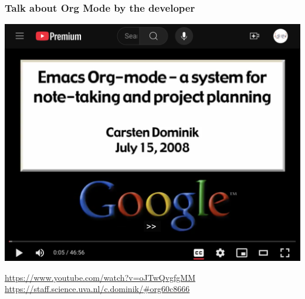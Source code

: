 \documentclass[aspectratio=169]{beamer}
\begin{document}
\begin{frame}
\frametitle{Talk about Org Mode by the developer}
\begin{center}
\includegraphics[scale=0.2]{Figures/Carsten2008.png}
\end{center}
\url{https://www.youtube.com/watch?v=oJTwQvgfgMM}
\url{https://staff.science.uva.nl/c.dominik/\#org60c8666}
\end{frame}










    
\end{document}
